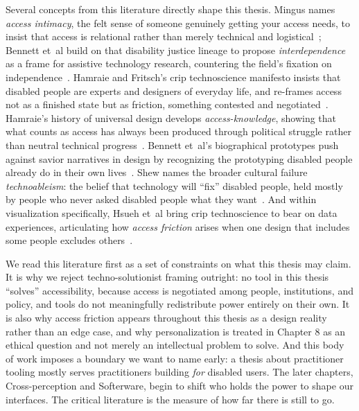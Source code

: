 \documentclass[12pt]{cmuthesis}
\newcommand{\ea}{{et~al\xperiod}\xspace}
\begin{document}
Several concepts from this literature directly shape this thesis. Mingus names \textit{access intimacy}, the felt sense of someone genuinely getting your access needs, to insist that access is relational rather than merely technical and logistical~\cite{Mingus2011AccessIntimacy}; Bennett \ea build on that disability justice lineage to propose \textit{interdependence} as a frame for assistive technology research, countering the field's fixation on independence~\cite{Bennett2018Interdependence}. Hamraie and Fritsch's crip technoscience manifesto insists that disabled people are experts and designers of everyday life, and re-frames access not as a finished state but as friction, something contested and negotiated~\cite{Hamraie2019Crip}. Hamraie's history of universal design develops \textit{access-knowledge}, showing that what counts as access has always been produced through political struggle rather than neutral technical progress~\cite{Hamraie2017Building, Hamraie}. Bennett \ea's biographical prototypes push against savior narratives in design by recognizing the prototyping disabled people already do in their own lives~\cite{Bennett2019Biographical}. Shew names the broader cultural failure \textit{technoableism}: the belief that technology will ``fix'' disabled people, held mostly by people who never asked disabled people what they want~\cite{Shew2023Technoableism}. And within visualization specifically, Hsueh \ea bring crip technoscience to bear on data experiences, articulating how \textit{access friction} arises when one design that includes some people excludes others~\cite{Hsueh}.
 
We read this literature first as a set of constraints on what this thesis may claim. It is why we reject techno-solutionist framing outright: no tool in this thesis ``solves'' accessibility, because access is negotiated among people, institutions, and policy, and tools do not meaningfully redistribute power entirely on their own. It is also why access friction appears throughout this thesis as a design reality rather than an edge case, and why personalization is treated in Chapter 8 as an ethical question and not merely an intellectual problem to solve. And this body of work imposes a boundary we want to name early: a thesis about practitioner tooling mostly serves practitioners building \textit{for} disabled users. The later chapters, Cross-perception and Softerware, begin to shift who holds the power to shape our interfaces. The critical literature is the measure of how far there is still to go.
\end{document}
